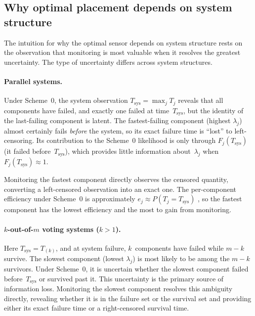 \documentclass[12pt]{article}
\theoremstyle{definition}
\theoremstyle{remark}
\begin{document}
\subsection{Why optimal placement depends on system structure}
\label{sec:structural-dependence}

The intuition for why the optimal sensor depends on system structure
rests on the observation that monitoring is most valuable when it
resolves the greatest uncertainty.  The type of uncertainty differs
across system structures.

\paragraph{Parallel systems.}
Under Scheme~0, the system observation $T_{\mathrm{sys}} = \max_j T_j$
reveals that all components have failed, and exactly one failed at
time~$T_{\mathrm{sys}}$, but the identity of the last-failing
component is latent.  The fastest-failing component (highest
$\lambda_j$) almost certainly fails \emph{before} the system, so its
exact failure time is ``lost'' to left-censoring.  Its contribution to
the Scheme~0 likelihood is only through $F_j(T_{\mathrm{sys}})$ (it
failed before~$T_{\mathrm{sys}}$), which provides little information
about~$\lambda_j$ when $F_j(T_{\mathrm{sys}}) \approx 1$.

Monitoring the fastest component directly observes the censored
quantity, converting a left-censored observation into an exact one.
The per-component efficiency under Scheme~0 is approximately
$e_j \approx P(T_j = T_{\mathrm{sys}})$ \citep{Towell2026}, so the
fastest component has the lowest efficiency and the most to gain from
monitoring.

\paragraph{\texorpdfstring{$k$-out-of-$m$}{k-out-of-m} voting systems (\texorpdfstring{$k > 1$}{k > 1}).}
Here $T_{\mathrm{sys}} = T_{(k)}$, and at system failure, $k$~components
have failed while $m - k$ survive.  The slowest component (lowest
$\lambda_j$) is most likely to be among the $m - k$ survivors.
Under Scheme~0, it is uncertain whether the slowest component failed
before~$T_{\mathrm{sys}}$ or survived past it.  This uncertainty is
the primary source of information loss.  Monitoring the slowest
component resolves this ambiguity directly, revealing whether it is in
the failure set or the survival set and providing either its exact
failure time or a right-censored survival time.
\end{document}
